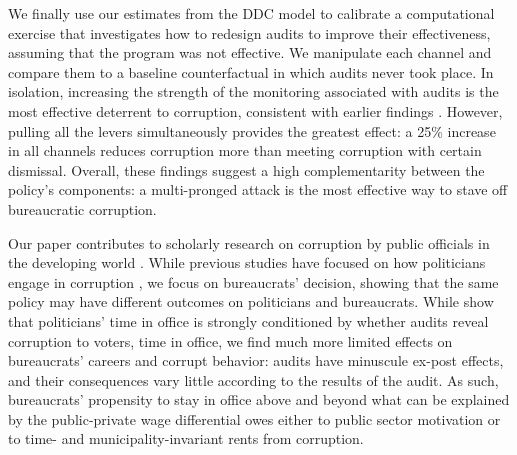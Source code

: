 We finally use our estimates from the DDC model to calibrate a computational exercise that investigates how to redesign audits to improve their effectiveness, assuming that the program was not effective. We manipulate each channel and compare them to a baseline counterfactual in which audits never took place. In isolation, increasing the strength of the monitoring associated with audits is the most effective deterrent to corruption, consistent with earlier findings \citep{olken_monitoring_2007,bobonis2016,zamboni_audit_2018}. However, pulling all the levers simultaneously provides the greatest effect: a 25\% increase in all channels reduces corruption more than meeting corruption with certain dismissal. Overall, these findings suggest a high complementarity between the policy's components: a multi-pronged attack is the most effective way to stave off bureaucratic corruption.

Our paper contributes to scholarly research on corruption by public officials in the developing world \citep{treisman2007have, olken_corruption_2012}. While previous studies have focused on how politicians engage in corruption \citep{nyblade2008cheats, ferraz_electoral_2011,bobonis2016}, we focus on bureaucrats' decision, showing that the same policy may have different outcomes on politicians and bureaucrats. While \citet{ferraz_electoral_2011} show that politicians' time in office is strongly conditioned by whether audits reveal corruption to voters, time in office, we find much more limited effects on bureaucrats' careers and corrupt behavior: audits have minuscule ex-post effects, and their consequences vary little according to the results of the audit. As such, bureaucrats' propensity to stay in office above and beyond what can be explained by the public-private wage differential owes either to public sector motivation or to time- and municipality-invariant rents from corruption. 


